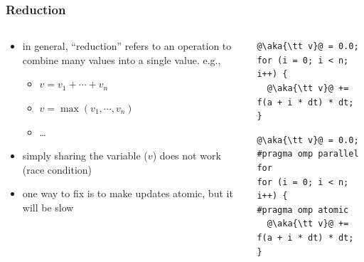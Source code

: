 \documentclass[12pt,dvipdfmx]{beamer}
\newcommand{\aka}[1]{{\color{red}#1}}
\begin{document}
\begin{frame}[fragile]
\frametitle{Reduction}
\begin{columns}
\begin{column}{0.55\textwidth}
\begin{itemize}
\item in general, ``reduction'' refers to an operation to combine
  many values into a single value. e.g.,
  \begin{itemize}
  \item $v = v_1 + \cdots + v_n$
  \item $v = \max(v_1, \cdots, v_n)$
  \item \ldots
  \end{itemize}

\item simply sharing the variable ($v$) does
  not work (race condition)

\item one way to fix is to make updates atomic, but it will be slow
\end{itemize}
\end{column}

\begin{column}{0.4\textwidth}
\begin{center}
\begin{lstlisting}
@\aka{\tt v}@ = 0.0;
for (i = 0; i < n; i++) {
  @\aka{\tt v}@ += f(a + i * dt) * dt;
}    
\end{lstlisting}

\begin{lstlisting}
@\aka{\tt v}@ = 0.0;
#pragma omp parallel for
for (i = 0; i < n; i++) {
#pragma omp atomic
  @\aka{\tt v}@ += f(a + i * dt) * dt;
}    
\end{lstlisting}
\def\svgwidth{\textwidth}
{\scriptsize }

\end{center}
\end{column}  

\end{columns}
\end{frame}
\end{document}
